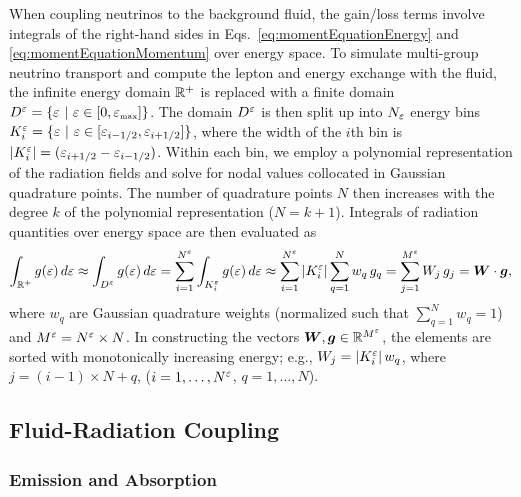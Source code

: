 \documentclass[10pt,preprint]{aastex}
\begin{document}
When coupling neutrinos to the background fluid, the gain/loss terms involve integrals of the right-hand sides in Eqs.~\eqref{eq:momentEquationEnergy} and \eqref{eq:momentEquationMomentum} over energy space.  
To simulate multi-group neutrino transport and compute the lepton and energy exchange with the fluid, the infinite energy domain $\mathbb{R}^{+}$ is replaced with a finite domain $D^{\varepsilon}=\{\varepsilon~|~\varepsilon\in[0,\varepsilon_{\mbox{\tiny max}}]\}$.  
The domain $D^{\varepsilon}$ is then split up into $N_{\varepsilon}$ energy bins $K_{i}^{\varepsilon}=\{\varepsilon~|~\varepsilon\in[\varepsilon_{i-1/2},\varepsilon_{i+1/2}]\}$, where the width of the $i$th bin is $|K_{i}^{\varepsilon}|=(\varepsilon_{i+1/2}-\varepsilon_{i-1/2})$.  
Within each bin, we employ a polynomial representation of the radiation fields and solve for nodal values collocated in Gaussian quadrature points.  
The number of quadrature points $N$ then increases with the degree $k$ of the polynomial representation ($N=k+1$).  
Integrals of radiation quantities over energy space are then evaluated as
\begin{equation}
  \int_{\mathbb{R}^{+}}g(\varepsilon)\,d\varepsilon
  \approx\int_{D^{\varepsilon}}g(\varepsilon)\,d\varepsilon
  =\sum_{i=1}^{N^{\varepsilon}}\int_{K_{i}^{\varepsilon}}g(\varepsilon)\,d\varepsilon
  \approx\sum_{i=1}^{N^{\varepsilon}}|K_{i}^{\varepsilon}|\sum_{q=1}^{N}w_{q}\,g_{q}=\sum_{j=1}^{M^{\varepsilon}} W_{j}\,g_{j}=\boldsymbol{W}\cdot\boldsymbol{g},
\end{equation}
where $w_{q}$ are Gaussian quadrature weights (normalized such that $\sum_{q=1}^{N}w_{q}=1$) and $M^{\varepsilon}=N^{\varepsilon}\times N$.  
In constructing the vectors $\boldsymbol{W},\boldsymbol{g}\in\mathbb{R}^{M^{\varepsilon}}$, the elements are sorted with monotonically increasing energy; e.g., $W_{j}=|K_{i}^{\varepsilon}|\,w_{q}$, where $j=(i-1)\times N+q$, ($i=1,\ldots,N^{\varepsilon}$, $q=1,\ldots,N$).  

\subsection{Fluid-Radiation Coupling}

\subsubsection{Emission and Absorption}
\end{document}
